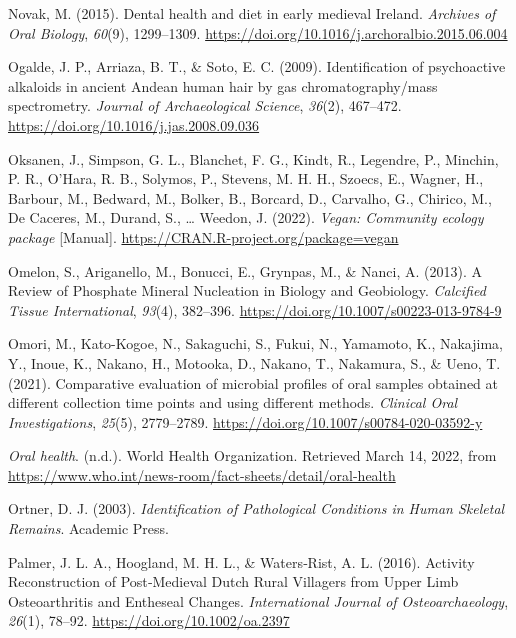 \documentclass[
  letterpaper,
]{book}
\newlength{\cslhangindent}
\newlength{\cslentryspacingunit} %
\newenvironment{CSLReferences}[2] %
 {%
  \setlength{\parindent}{0pt}
  \ifodd #1
  \let\oldpar\par
  \def\par{\hangindent=\cslhangindent\oldpar}
  \fi
  \setlength{\parskip}{#2\cslentryspacingunit}
 }%
 {}
\begin{document}
\begin{CSLReferences}{1}{0}
\leavevmode{}%
Novak, M. (2015). Dental health and diet in early medieval {Ireland}.
\emph{Archives of Oral Biology}, \emph{60}(9), 1299--1309.
\url{https://doi.org/10.1016/j.archoralbio.2015.06.004}

\leavevmode{}%
Ogalde, J. P., Arriaza, B. T., \& Soto, E. C. (2009). Identification of
psychoactive alkaloids in ancient {Andean} human hair by gas
chromatography/mass spectrometry. \emph{Journal of Archaeological
Science}, \emph{36}(2), 467--472.
\url{https://doi.org/10.1016/j.jas.2008.09.036}

\leavevmode{}%
Oksanen, J., Simpson, G. L., Blanchet, F. G., Kindt, R., Legendre, P.,
Minchin, P. R., O'Hara, R. B., Solymos, P., Stevens, M. H. H., Szoecs,
E., Wagner, H., Barbour, M., Bedward, M., Bolker, B., Borcard, D.,
Carvalho, G., Chirico, M., De Caceres, M., Durand, S., \ldots{} Weedon,
J. (2022). \emph{Vegan: {Community} ecology package} {[}Manual{]}.
\url{https://CRAN.R-project.org/package=vegan}

\leavevmode{}%
Omelon, S., Ariganello, M., Bonucci, E., Grynpas, M., \& Nanci, A.
(2013). A {Review} of {Phosphate Mineral Nucleation} in {Biology} and
{Geobiology}. \emph{Calcified Tissue International}, \emph{93}(4),
382--396. \url{https://doi.org/10.1007/s00223-013-9784-9}

\leavevmode{}%
Omori, M., Kato-Kogoe, N., Sakaguchi, S., Fukui, N., Yamamoto, K.,
Nakajima, Y., Inoue, K., Nakano, H., Motooka, D., Nakano, T., Nakamura,
S., \& Ueno, T. (2021). Comparative evaluation of microbial profiles of
oral samples obtained at different collection time points and using
different methods. \emph{Clinical Oral Investigations}, \emph{25}(5),
2779--2789. \url{https://doi.org/10.1007/s00784-020-03592-y}

\leavevmode{}%
\emph{Oral health}. (n.d.). {World Health Organization}. Retrieved March
14, 2022, from
\url{https://www.who.int/news-room/fact-sheets/detail/oral-health}

\leavevmode{}%
Ortner, D. J. (2003). \emph{Identification of {Pathological Conditions}
in {Human Skeletal Remains}}. {Academic Press}.

\leavevmode{}%
Palmer, J. L. A., Hoogland, M. H. L., \& Waters‐Rist, A. L. (2016).
Activity {Reconstruction} of {Post}‐{Medieval Dutch Rural Villagers}
from {Upper Limb Osteoarthritis} and {Entheseal Changes}.
\emph{International Journal of Osteoarchaeology}, \emph{26}(1), 78--92.
\url{https://doi.org/10.1002/oa.2397}


\end{CSLReferences}
\end{document}
